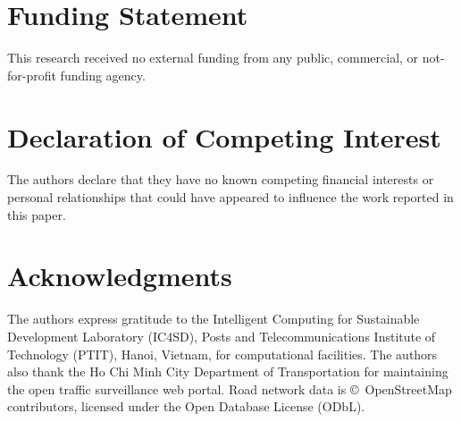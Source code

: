 \documentclass[preprint,12pt]{elsarticle}
\begin{document}
\section{Funding Statement}
This research received no external funding from any public, commercial, or not-for-profit funding agency.

\section{Declaration of Competing Interest}
The authors declare that they have no known competing financial interests or personal relationships that could have appeared to influence the work reported in this paper.

\section{Acknowledgments}
The authors express gratitude to the Intelligent Computing for Sustainable Development Laboratory (IC4SD), Posts and Telecommunications Institute of Technology (PTIT), Hanoi, Vietnam, for computational facilities. The authors also thank the Ho Chi Minh City Department of Transportation for maintaining the open traffic surveillance web portal. Road network data is \copyright\ OpenStreetMap contributors, licensed under the Open Database License (ODbL).



\end{document}
